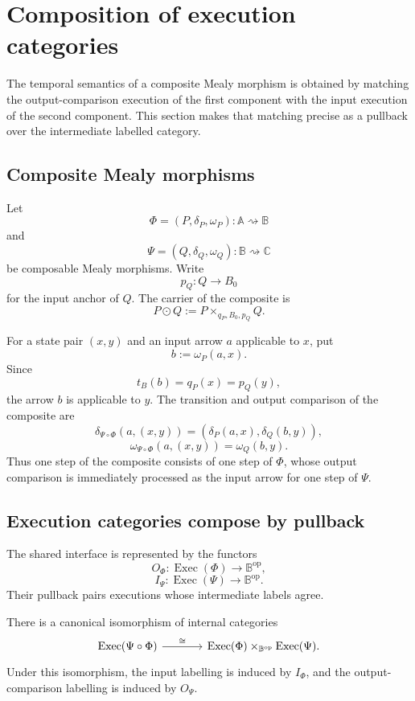 \section{Composition of execution categories}
\label{sec:composition-temporal-execution}

The temporal semantics of a composite Mealy morphism is obtained by matching
the output-comparison execution of the first component with the input
execution of the second component.  This section makes that matching precise
as a pullback over the intermediate labelled category.

\subsection{Composite Mealy morphisms}
\label{subsec:composite-mealy-morphisms}

Let
\[
    \Phi=(P,\delta_P,\omega_P):
    \mathbb A\rightsquigarrow\mathbb B
\]
and
\[
    \Psi=(Q,\delta_Q,\omega_Q):
    \mathbb B\rightsquigarrow\mathbb C
\]
be composable Mealy morphisms. Write
\[
    p_Q:Q\to B_0
\]
for the input anchor of \(Q\). The carrier of the composite is
\[
    P\odot Q
    :=
    P\times_{q_P,B_0,p_Q}Q.
\]

For a state pair \((x,y)\) and an input arrow \(a\) applicable to \(x\), put
\[
    b:=\omega_P(a,x).
\]
Since
\[
    t_B(b)=q_P(x)=p_Q(y),
\]
the arrow \(b\) is applicable to \(y\). The transition and output comparison
of the composite are
\[
    \delta_{\Psi\circ\Phi}(a,(x,y))
    =
    \left(
        \delta_P(a,x),
        \delta_Q(b,y)
    \right),
\]
\[
    \omega_{\Psi\circ\Phi}(a,(x,y))
    =
    \omega_Q(b,y).
\]
Thus one step of the composite consists of one step of \(\Phi\), whose output
comparison is immediately processed as the input arrow for one step of
\(\Psi\).

\subsection{Execution categories compose by pullback}
\label{subsec:execution-category-pullback}

The shared interface is represented by the functors
\[
    O_\Phi:
    \operatorname{Exec}(\Phi)\to\mathbb B^{\mathrm{op}},
\]
\[
    I_\Psi:
    \operatorname{Exec}(\Psi)\to\mathbb B^{\mathrm{op}}.
\]
Their pullback pairs executions whose intermediate labels agree.

\begin{theorem}
\label{thm:execution-category-composition}
There is a canonical isomorphism of internal categories
\[
\begin{tikzcd}[column sep=large]
    \operatorname{Exec}(\Psi\circ\Phi)
        \arrow[r, "\cong"]
    &
    \operatorname{Exec}(\Phi)
        \times_{\mathbb B^{\mathrm{op}}}
    \operatorname{Exec}(\Psi).
\end{tikzcd}
\]
Under this isomorphism, the input labelling is induced by \(I_\Phi\), and the
output-comparison labelling is induced by \(O_\Psi\).
\end{theorem}

